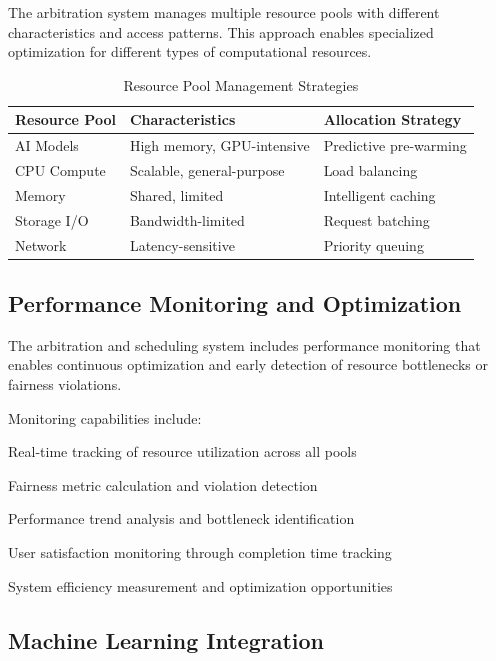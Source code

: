 The arbitration system manages multiple resource pools with different characteristics and access patterns. This approach enables specialized optimization for different types of computational resources.

\begin{table}[ht]
\centering
\begin{tabular}{@{}lll@{}}
\toprule
\textbf{Resource Pool} & \textbf{Characteristics} & \textbf{Allocation Strategy} \\
\midrule
AI Models & High memory, GPU-intensive & Predictive pre-warming \\
CPU Compute & Scalable, general-purpose & Load balancing \\
Memory & Shared, limited & Intelligent caching \\
Storage I/O & Bandwidth-limited & Request batching \\
Network & Latency-sensitive & Priority queuing \\
\bottomrule
\end{tabular}
\caption{Resource Pool Management Strategies}
\end{table}

\subsection*{Performance Monitoring and Optimization}

The arbitration and scheduling system includes performance monitoring that enables continuous optimization and early detection of resource bottlenecks or fairness violations.

Monitoring capabilities include:

\begin{compactlist}
    \item Real-time tracking of resource utilization across all pools
    \item Fairness metric calculation and violation detection
    \item Performance trend analysis and bottleneck identification
    \item User satisfaction monitoring through completion time tracking
    \item System efficiency measurement and optimization opportunities
\end{compactlist}

\subsection*{Machine Learning Integration}


